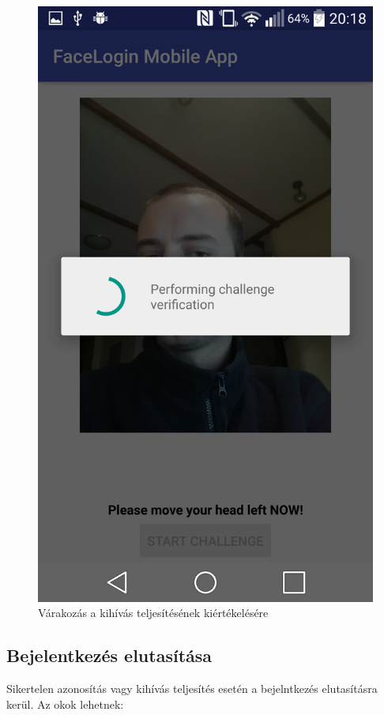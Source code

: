 \begin{figure}[h]
\begin{minipage}{.30\textwidth}
     \includegraphics[scale=0.10]{img/performing_challenge_verification}
     \caption{Várakozás a kihívás teljesítésének kiértékelésére}
 \end{minipage}
\end{figure}

\subsection{Bejelentkezés elutasítása}
Sikertelen azonosítás vagy kihívás teljesítés esetén a bejelntkezés elutasításra kerül. Az okok lehetnek:

